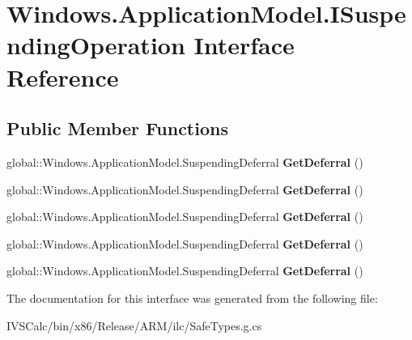 \hypertarget{interface_windows_1_1_application_model_1_1_i_suspending_operation}{}\section{Windows.\+Application\+Model.\+I\+Suspending\+Operation Interface Reference}
\label{interface_windows_1_1_application_model_1_1_i_suspending_operation}
\subsection*{Public Member Functions}
\begin{DoxyCompactItemize}
\item 
\mbox{\label{interface_windows_1_1_application_model_1_1_i_suspending_operation_a9a67864db41433b07ff5318f55487a76}} 
global\+::\+Windows.\+Application\+Model.\+Suspending\+Deferral {\bfseries Get\+Deferral} ()
\item 
\mbox{\label{interface_windows_1_1_application_model_1_1_i_suspending_operation_a9a67864db41433b07ff5318f55487a76}} 
global\+::\+Windows.\+Application\+Model.\+Suspending\+Deferral {\bfseries Get\+Deferral} ()
\item 
\mbox{\label{interface_windows_1_1_application_model_1_1_i_suspending_operation_a9a67864db41433b07ff5318f55487a76}} 
global\+::\+Windows.\+Application\+Model.\+Suspending\+Deferral {\bfseries Get\+Deferral} ()
\item 
\mbox{\label{interface_windows_1_1_application_model_1_1_i_suspending_operation_a9a67864db41433b07ff5318f55487a76}} 
global\+::\+Windows.\+Application\+Model.\+Suspending\+Deferral {\bfseries Get\+Deferral} ()
\item 
\mbox{\label{interface_windows_1_1_application_model_1_1_i_suspending_operation_a9a67864db41433b07ff5318f55487a76}} 
global\+::\+Windows.\+Application\+Model.\+Suspending\+Deferral {\bfseries Get\+Deferral} ()
\end{DoxyCompactItemize}


The documentation for this interface was generated from the following file\+:\begin{DoxyCompactItemize}
\item 
I\+V\+S\+Calc/bin/x86/\+Release/\+A\+R\+M/ilc/Safe\+Types.\+g.\+cs\end{DoxyCompactItemize}
